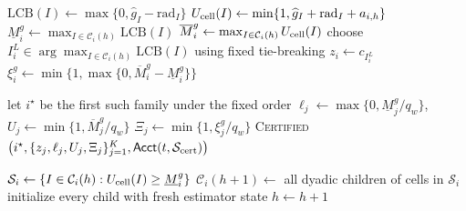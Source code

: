 \begin{algorithm}[t]
\begin{algorithmic}[1]
            \State $\mathrm{LCB}(I)\gets\max\{0,\widehat g_I-\mathrm{rad}_I\}$
            \State $U_{\rm cell}(I)\gets
            \min\{1,\widehat g_I+\mathrm{rad}_I+a_{i,h}\}$
        \EndFor
        \State $\underline M_i^g\gets\max_{I\in\mathcal C_i(h)}\mathrm{LCB}(I)$
        \State $\overline M_i^g\gets\max_{I\in\mathcal C_i(h)}U_{\rm cell}(I)$
        \State choose $I_i^L\in\arg\max_{I\in\mathcal C_i(h)}\mathrm{LCB}(I)$ using fixed tie-breaking
        \State $z_i\gets c_{I_i^L}$
        \State $\xi_i^g\gets\min\{1,\max\{0,\overline M_i^g-\underline M_i^g\}\}$
    \EndFor

        \State let $i^\star$ be the first such family under the fixed order
            \State $\ell_j\gets\max\{0,\underline M_j^g/q_w\}$,
            $U_j\gets\min\{1,\overline M_j^g/q_w\}$
            \State $\Xi_j\gets\min\{1,\xi_j^g/q_w\}$
        \EndFor
        \State \Return \textsc{Certified}$\bigl(i^\star,
        \{z_j,\ell_j,U_j,\Xi_j\}_{j=1}^K,
        \mathsf{Acct}(t,\mathcal S_{\rm cert})\bigr)$
    \EndIf

        \State $\mathcal S_i\gets
        \{I\in\mathcal C_i(h):U_{\rm cell}(I)\ge\underline M_i^g\}$
        \State $\mathcal C_i(h+1)\gets$ all dyadic children of cells in $\mathcal S_i$
        \State initialize every child with fresh estimator state
    \EndFor
    \State $h\gets h+1$
\EndWhile
\end{algorithmic}
\end{algorithm}
